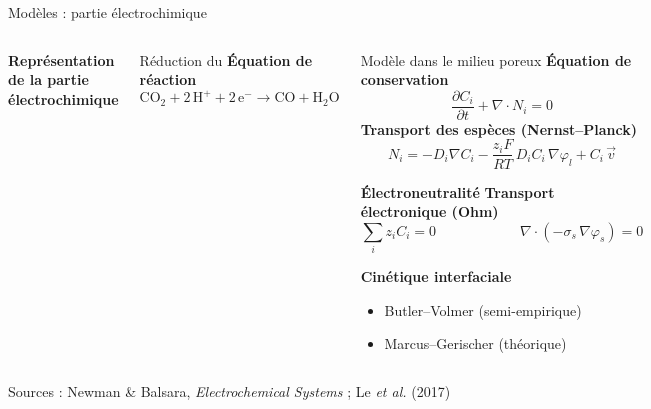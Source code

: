 \begin{frame}[t]{Modèles : partie électrochimique}
  \vspace{-1em}

  \begin{columns}[T,onlytextwidth]

      \begin{pccard}
        \centering
        \figschemaelectrochimique
        \vspace{0.5em}
        {\scriptsize\bfseries\color{pcNavy}
        Représentation de la partie électrochimique}
      \end{pccard}

      \begin{pcbanner}{Réduction du }
      \centering\scriptsize
      \textbf{Équation de réaction}
      \[ \mathrm{CO_2} + 2\,\mathrm{H^+} + 2\,\mathrm{e^-} \rightarrow \mathrm{CO} + \mathrm{H_2O} \]
      \end{pcbanner}

      \vspace{-0.5em}
        \begin{pcbanner}{Modèle dans le milieu poreux}
        \vspace{0.4em}
        \centering\scriptsize
        \textbf{Équation de conservation}
        \[ \frac{\partial C_i}{\partial t} + \nabla\!\cdot\! N_i = 0 \]
        \textbf{Transport des espèces (Nernst--Planck)}
        \[ N_i = -D_i\nabla C_i - \frac{z_i F}{RT}\,D_i C_i\,\nabla\varphi_l + C_i\,\vec{v} \]

        \textbf{Électroneutralité} \qquad \textbf{Transport électronique (Ohm)}
        \[ \sum_i z_i C_i = 0 \qquad \qquad \qquad \nabla\!\cdot\!\left(-\sigma_s\,\nabla\varphi_s\right) = 0 \]

        \textbf{Cinétique interfaciale}\\[0.3em]
        \begin{itemize}\scriptsize
          \item Butler--Volmer (semi-empirique)
          \item Marcus--Gerischer (théorique)
        \end{itemize}
        \end{pcbanner}

    \end{columns}
  {\tiny\color{pcNavy!60} Sources : Newman \& Balsara, \textit{Electrochemical Systems} ; Le \textit{et al.} (2017)}

\end{frame}

